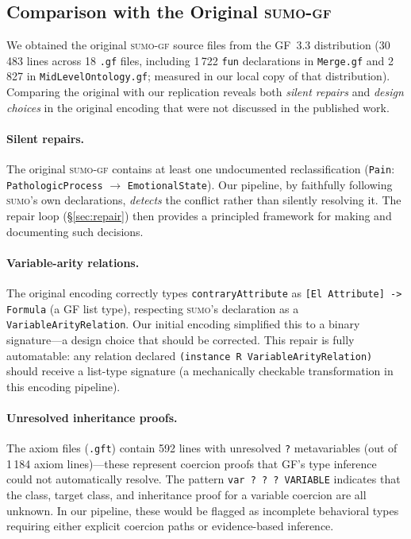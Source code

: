 \documentclass[11pt]{article}
\newcommand{\SUMO}{\textsc{sumo}}
\newcommand{\GF}{\textsc{gf}}
\theoremstyle{definition}
\theoremstyle{plain}
\begin{document}
\subsection{Comparison with the Original \SUMO{}-\GF{}}
\label{sec:evidence-repair}

We obtained the original \SUMO{}-\GF{} source files from the GF~3.3
distribution (30\,483 lines across 18 \texttt{.gf} files, including
1\,722 \texttt{fun} declarations in \texttt{Merge.gf} and 2\,827 in
\texttt{MidLevelOntology.gf}; measured in our local copy of that distribution).
Comparing the original with our
replication reveals both \emph{silent repairs} and
\emph{design choices} in the original encoding that were not
discussed in the published work.

\paragraph{Silent repairs.}
The original \SUMO{}-\GF{} contains at least one undocumented
reclassification (\texttt{Pain}: \texttt{PathologicProcess} $\to$
\texttt{EmotionalState}).  Our pipeline, by faithfully following
\SUMO{}'s own declarations, \emph{detects} the conflict rather than
silently resolving it.  The repair loop (\S\ref{sec:repair}) then
provides a principled framework for making and documenting such
decisions.

\paragraph{Variable-arity relations.}
The original encoding correctly types \texttt{contraryAttribute}
as \texttt{[El Attribute] -> Formula} (a GF list type), respecting
\SUMO{}'s declaration as a \texttt{VariableArityRelation}.  Our
initial encoding simplified this to a binary signature---a design
choice that should be corrected.  This repair is fully automatable:
any relation declared \texttt{(instance R VariableArityRelation)}
should receive a list-type signature (a mechanically checkable transformation
in this encoding pipeline).

\paragraph{Unresolved inheritance proofs.}
The axiom files (\texttt{.gft}) contain 592 lines with unresolved
\texttt{?} metavariables (out of 1\,184 axiom lines)---these
represent coercion proofs that GF's type inference could not
automatically resolve.  The pattern
\texttt{var~?~?~?~VARIABLE} indicates that the class, target class,
and inheritance proof for a variable coercion are all unknown.
In our pipeline, these would be flagged as incomplete behavioral
types requiring either explicit coercion paths or evidence-based
inference.
\end{document}
